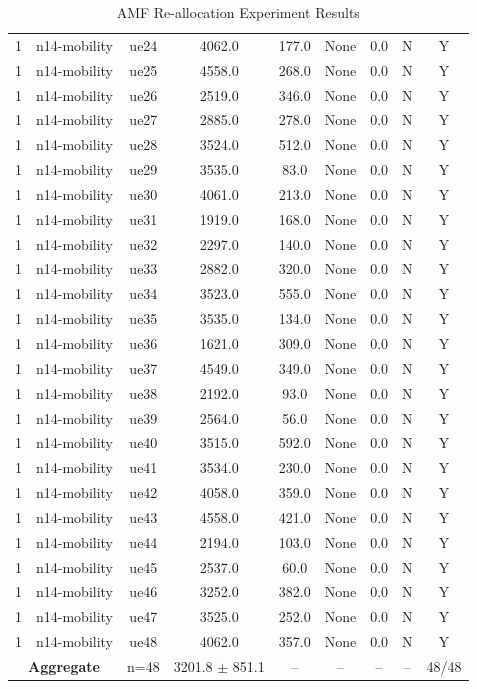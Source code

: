 \begin{table}[ht]
\begin{tabular}{|c|c|c|c|c|c|c|c|c|}
1 & n14-mobility & ue24 & 4062.0 & 177.0 & None & 0.0 & N & Y \\
1 & n14-mobility & ue25 & 4558.0 & 268.0 & None & 0.0 & N & Y \\
1 & n14-mobility & ue26 & 2519.0 & 346.0 & None & 0.0 & N & Y \\
1 & n14-mobility & ue27 & 2885.0 & 278.0 & None & 0.0 & N & Y \\
1 & n14-mobility & ue28 & 3524.0 & 512.0 & None & 0.0 & N & Y \\
1 & n14-mobility & ue29 & 3535.0 & 83.0 & None & 0.0 & N & Y \\
1 & n14-mobility & ue30 & 4061.0 & 213.0 & None & 0.0 & N & Y \\
1 & n14-mobility & ue31 & 1919.0 & 168.0 & None & 0.0 & N & Y \\
1 & n14-mobility & ue32 & 2297.0 & 140.0 & None & 0.0 & N & Y \\
1 & n14-mobility & ue33 & 2882.0 & 320.0 & None & 0.0 & N & Y \\
1 & n14-mobility & ue34 & 3523.0 & 555.0 & None & 0.0 & N & Y \\
1 & n14-mobility & ue35 & 3535.0 & 134.0 & None & 0.0 & N & Y \\
1 & n14-mobility & ue36 & 1621.0 & 309.0 & None & 0.0 & N & Y \\
1 & n14-mobility & ue37 & 4549.0 & 349.0 & None & 0.0 & N & Y \\
1 & n14-mobility & ue38 & 2192.0 & 93.0 & None & 0.0 & N & Y \\
1 & n14-mobility & ue39 & 2564.0 & 56.0 & None & 0.0 & N & Y \\
1 & n14-mobility & ue40 & 3515.0 & 592.0 & None & 0.0 & N & Y \\
1 & n14-mobility & ue41 & 3534.0 & 230.0 & None & 0.0 & N & Y \\
1 & n14-mobility & ue42 & 4058.0 & 359.0 & None & 0.0 & N & Y \\
1 & n14-mobility & ue43 & 4558.0 & 421.0 & None & 0.0 & N & Y \\
1 & n14-mobility & ue44 & 2194.0 & 103.0 & None & 0.0 & N & Y \\
1 & n14-mobility & ue45 & 2537.0 & 60.0 & None & 0.0 & N & Y \\
1 & n14-mobility & ue46 & 3252.0 & 382.0 & None & 0.0 & N & Y \\
1 & n14-mobility & ue47 & 3525.0 & 252.0 & None & 0.0 & N & Y \\
1 & n14-mobility & ue48 & 4062.0 & 357.0 & None & 0.0 & N & Y \\
\multicolumn{2}{|c|}{\textbf{Aggregate}} & n=48 & 3201.8 $\pm$ 851.1 & -- & -- & -- & -- & 48/48 \\
\hline
\end{tabular}
\caption{AMF Re-allocation Experiment Results}
\label{tab:amf_realloc}
\end{table}
